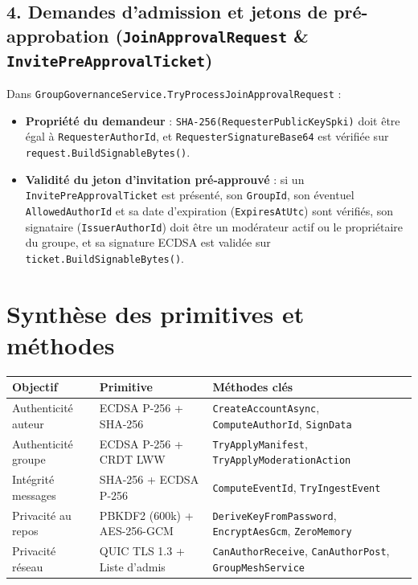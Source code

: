 \documentclass[11pt,a4paper]{article}
\begin{document}
\subsection{4. Demandes d'admission et jetons de pré-approbation (\texttt{JoinApprovalRequest} \& \texttt{InvitePreApprovalTicket})}
Dans \texttt{GroupGovernanceService.TryProcessJoinApprovalRequest} :
\begin{itemize}
    \item \textbf{Propriété du demandeur} : \texttt{SHA-256(RequesterPublicKeySpki)} doit être égal à \texttt{RequesterAuthorId}, et \texttt{RequesterSignatureBase64} est vérifiée sur \texttt{request.BuildSignableBytes()}.
    \item \textbf{Validité du jeton d'invitation pré-approuvé} : si un \texttt{InvitePreApprovalTicket} est présenté, son \texttt{GroupId}, son éventuel \texttt{AllowedAuthorId} et sa date d'expiration (\texttt{ExpiresAtUtc}) sont vérifiés, son signataire (\texttt{IssuerAuthorId}) doit être un modérateur actif ou le propriétaire du groupe, et sa signature ECDSA est validée sur \texttt{ticket.BuildSignableBytes()}.
\end{itemize}

\section{Synthèse des primitives et méthodes}

\begin{center}
\footnotesize
\begin{tabular}{@{}llp{5.8cm}@{}}
\toprule
\textbf{Objectif} & \textbf{Primitive} & \textbf{Méthodes clés} \\
\midrule
Authenticité auteur & ECDSA P-256 + SHA-256 & \texttt{CreateAccountAsync}, \texttt{ComputeAuthorId}, \texttt{SignData} \\
Authenticité groupe & ECDSA P-256 + CRDT LWW & \texttt{TryApplyManifest}, \texttt{TryApplyModerationAction} \\
Intégrité messages & SHA-256 + ECDSA P-256 & \texttt{ComputeEventId}, \texttt{TryIngestEvent} \\
Privacité au repos & PBKDF2 (600k) + AES-256-GCM & \texttt{DeriveKeyFromPassword}, \texttt{EncryptAesGcm}, \texttt{ZeroMemory} \\
Privacité réseau & QUIC TLS 1.3 + Liste d'admis & \texttt{CanAuthorReceive}, \texttt{CanAuthorPost}, \texttt{GroupMeshService} \\
\bottomrule
\end{tabular}
\end{center}
\end{document}
